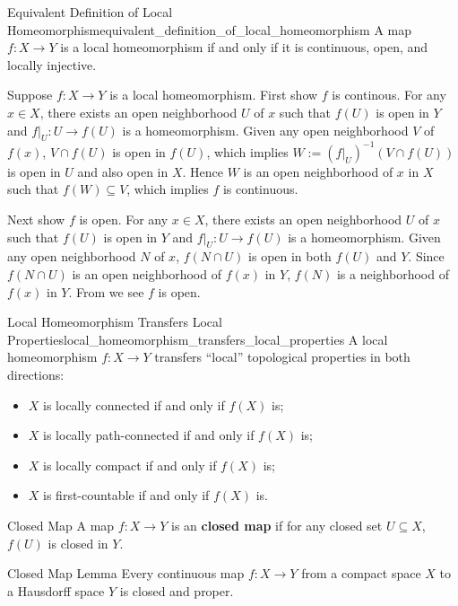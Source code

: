 \documentclass{report}
\begin{document}
\begin{proposition}{Equivalent Definition of Local Homeomorphism}{equivalent_definition_of_local_homeomorphism}
	A map $f:X\to Y$ is a local homeomorphism if and only if it is continuous, open, and locally injective.
\end{proposition}
\begin{prf}
	Suppose $f:X\to Y$ is a local homeomorphism. First show 
	$f$ is continous. For any $x\in X$, there exists an open neighborhood $U$ of $x$ such that $f(U)$ is open in $Y$ and $f|_U:U\to f(U)$ is a homeomorphism. Given any open neighborhood $V$ of $f(x)$, $V\cap f(U)$ is open in $f(U)$, which implies $W:=(f|_U)^{-1}(V\cap f(U))$ is open in $U$ and also open in $X$. Hence $W$ is an open neighborhood of $x$ in $X$ such that $f(W)\subseteq V$, which implies $f$ is continuous.

	Next show $f$ is open. For any $x\in X$, there exists an open neighborhood $U$ of $x$ such that $f(U)$ is open in $Y$ and $f|_U:U\to f(U)$ is a homeomorphism. Given any open neighborhood $N$ of $x$, $f(N \cap U)$ is open in both $f(U)$ and $Y$. Since $f(N\cap U)$ is an open neighborhood of $f(x)$ in $Y$, $f(N)$ is a neighborhood of $f(x)$ in $Y$. From  we see $f$ is open.
\end{prf}

\begin{proposition}{Local Homeomorphism Transfers Local Properties}{local_homeomorphism_transfers_local_properties}
	A local homeomorphism $f: X \rightarrow Y$ transfers ``local'' topological properties in both directions:
	\begin{itemize}
		\item $X$ is locally connected if and only if $f(X)$ is;
		\item  $X$ is locally path-connected if and only if $f(X)$ is;
		\item  $X$ is locally compact if and only if $f(X)$ is;
		\item  $X$ is first-countable if and only if $f(X)$ is.
	\end{itemize}
\end{proposition}


\begin{definition}{Closed Map}{}
	A map $f:X\to Y$ is an \textbf{closed map} if for any closed set $U\subseteq X$, $f(U)$ is closed in $Y$.
\end{definition}

\begin{lemma}{Closed Map Lemma}{}
	Every continuous map $f: X \rightarrow Y$ from a compact space $X$ to a Hausdorff space $Y$ is closed and proper.
\end{lemma}
\end{document}
